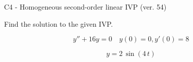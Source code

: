 \begin{exercise}
  \begin{exerciseTitle}C4 - Homogeneous second-order linear IVP (ver. 54)\end{exerciseTitle}
  \begin{exerciseStatement}
    
Find the solution to the given IVP.

    
\[y''+16y = 0 \hspace{1em} y(0) = 0 , y'(0) = 8\]

  \end{exerciseStatement}
  \begin{exerciseAnswer}
    
\[y= 2 \, \sin\left(4 \, t\right)\]

  \end{exerciseAnswer}
\end{exercise}